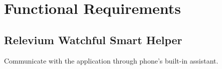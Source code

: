 \documentclass{scrreprt}
\begin{document}





\chapter{Functional Requirements}

\section{Relevium Watchful Smart Helper}
Communicate with the application through phone's built-in assistant.
\end{document}
